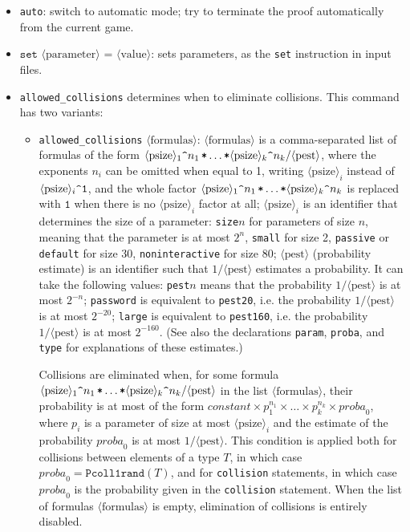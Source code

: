 \documentclass{article}
\newcommand{\tttimes}{\mathop{\texttt{*}}}
\newcommand{\nonterm}[1]{\langle\textrm{#1}\rangle}
\begin{document}
\begin{itemize}
\item \texttt{auto}: switch to automatic mode; try to
terminate the proof automatically from the current game.

\item $\texttt{set }\nonterm{parameter}\texttt{ = }\nonterm{value}$:
sets parameters, as the \texttt{set} instruction in input files.

\item \texttt{allowed\string_collisions} determines when to eliminate collisions. This command has two variants:
\begin{itemize}
\item \texttt{allowed\string_collisions} $\nonterm{formulas}$: 
$\nonterm{formulas}$ is 
a comma-separated list of formulas of the form
$\nonterm{psize}_1\texttt{\string^}{n_1} \tttimes \dots \tttimes \nonterm{psize}_k\texttt{\string^}{n_k} / \nonterm{pest}$,
where the exponents $n_i$ can be omitted when equal to 1, writing $\nonterm{psize}_i$ instead of $\nonterm{psize}_i\texttt{\string^1}$, and the whole factor $\nonterm{psize}_1\texttt{\string^}{n_1} \tttimes \dots \tttimes \nonterm{psize}_k\texttt{\string^}{n_k}$ is replaced with $\texttt{1}$ when there is no $\nonterm{psize}_i$ factor at all;
$\nonterm{psize}_i$ is an identifier that determines the size of a
parameter: \texttt{size$n$} for parameters of size $n$, meaning that the parameter is at most $2^n$,
\texttt{small} for size 2, \texttt{passive} or \texttt{default} for size 30,
\texttt{noninteractive} for size 80;
$\nonterm{pest}$ ({\sc p}robability {\sc est}imate) is an identifier 
such that $1/\nonterm{pest}$ estimates a probability. It can take the following values:
\texttt{pest$n$} means that the probability $1/\nonterm{pest}$ is at most $2^{-n}$;
\texttt{password} is equivalent to \texttt{pest20}, i.e. the probability $1/\nonterm{pest}$ is at most $2^{-20}$;
\texttt{large} is equivalent to \texttt{pest160}, i.e. the probability $1/\nonterm{pest}$ is at most $2^{-160}$. (See also the declarations \texttt{param}, \texttt{proba},
and \texttt{type} for explanations of these estimates.)

\newcommand{\proba}{\mathit{proba}_0}
Collisions are eliminated when, for some formula $\nonterm{psize}_1\texttt{\string^}{n_1} \tttimes \dots \tttimes \nonterm{psize}_k\texttt{\string^}{n_k} / \nonterm{pest}$ in the list $\nonterm{formulas}$, their probability 
is at most of the form  $\textit{constant} \times p_1^{n_1} \times \dots \times p_k^{n_k} \times \proba$,
where $p_i$ is a parameter of size at most $\nonterm{psize}_i$
and the estimate of the probability $\proba$ is at most $1/\nonterm{pest}$.
This condition is applied both for collisions between elements of a type $T$, in which case
$\proba = \texttt{Pcoll1rand}(T)$, and for \texttt{collision} statements, in which case $\proba$ is the
probability given in the \texttt{collision} statement.
When the list of formulas $\nonterm{formulas}$ is empty, elimination of collisions is entirely disabled.


\end{itemize}
\end{itemize}
\end{document}
